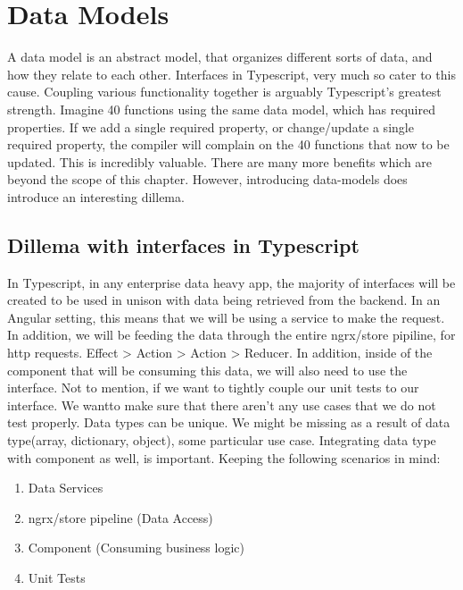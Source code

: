 \section{ Data Models }
\maketitle{}

A data model is an abstract model, that organizes different sorts of data,
and how they relate to each other. Interfaces in Typescript, very much so cater
to this cause. Coupling various functionality together is arguably Typescript's
greatest strength. Imagine 40 functions using the same data model, which has
required properties. If we add a single required property, or change/update
a single required property, the compiler will complain on the 40 functions that
now to be updated. This is incredibly valuable. There are many more benefits
which are beyond the scope of this chapter. However, introducing data-models
does introduce an interesting dillema.

\subsection{Dillema with interfaces in Typescript}
In Typescript, in any enterprise data heavy app, the majority of interfaces will
be created to be used in unison with data being retrieved from the backend.
In an Angular setting, this means that we will be using a service to make the
request. In addition, we will be feeding the data through the entire ngrx/store
pipiline, for http requests. Effect > Action > Action > Reducer. In addition,
inside of the component that will be consuming this data, we will also need
to use the interface. Not to mention, if we want to tightly couple our unit
tests to our interface. We wantto make sure that there aren't any use cases
that we do not test properly. Data types can be unique. We might be missing as a result of data type(array, dictionary, object), some particular use case.
Integrating data type with component as well, is important. Keeping the
following scenarios in mind:
\begin{enumerate}
  \item Data Services
  \item ngrx/store pipeline (Data Access)
  \item Component (Consuming business logic)
  \item Unit Tests
\end{enumerate}

